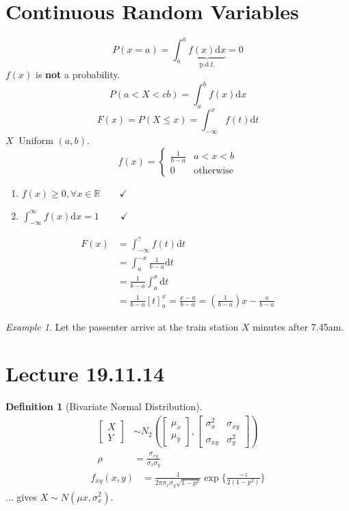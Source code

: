 \documentclass{article}
\theoremstyle{definition}
\newtheorem{definition}{Definition}[section]
\theoremstyle{remark}
\theoremstyle{example}
\newtheorem*{example}{Example}
\renewcommand{\d}{\mathrm{d}}
\newcommand{\R}{\mathbb{R}}
\begin{document}
	\section*{Continuous Random Variables}
	\[P(x=a)=\int_{a}^{a}\underbrace{f(x)\d x}_\mathrm{p.d.f.} = 0\]
	$f(x)$ is \textbf{not} a probability.\\
	\[P(a < X < cb) = \int_{a}^{b}f(x)\d x\]
	\[F(x)=P(X \leq x)=\int_{-\infty}^{x}f(t) \d t \]
	$X ~ $ Uniform $(a,b)$.
	\[f(x)=\begin{cases}
		\frac{1}{b-a}& a < x < b\\
		0 & \mathrm{otherwise}
	\end{cases}\]
	\begin{enumerate}
		\item $f(x)\geq0, \forall x \in \R \qquad \checkmark$
		\item $\int_{-\infty}^{\infty}f(x) \d x = 1 \qquad\  \checkmark$
	\end{enumerate}
	\begin{align*}
		F(x)&=\int_{-\infty}^{?}f(t) \d t\\
		& = \int_{a}^{-x}\frac{1}{b-a} \d t\\
		& = \frac{1}{b-a} \int_{a}^{x}\d t\\
		& = \frac{1}{b-a}[t]^x_a=\frac{x-a}{b-a}=\left(\frac{1}{b-a}\right)x-\frac{a}{b-a}
	\end{align*}
	
	\begin{example}
		Let the passenter arrive at the train station $X$ minutes after 7.45am.
	\end{example}

	\section*{Lecture 19.11.14}
	\begin{definition}[Bivariate Normal Distribution]
		\begin{align*}
			\begin{bmatrix}
			X\\
			Y
			\end{bmatrix} & \sim N_2 \left(\begin{bmatrix}
			\mu_x\\
			\mu_y 
			\end{bmatrix},\begin{bmatrix}
			\sigma^2_x & \sigma_{xy}\\
			\sigma_{xy} & \sigma^2_y
			\end{bmatrix}\right)\\
			\rho & = \frac{\sigma_{xy}}{\sigma_x \sigma_y}
		\end{align*}
		\begin{align*}
			f_{xy}(x,y)&=\frac{1}{2 \pi \sigma_x\sigma_y\sqrt{1-p^2}}\exp \{\frac{-z}{2(1-p^2)}\}
		\end{align*}
		... gives $X \sim N(\mu x , \sigma^2_x)$.
	\end{definition}
\end{document}
